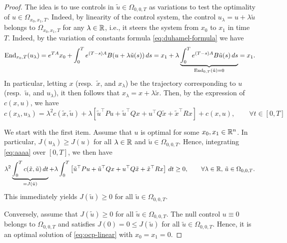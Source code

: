 \begin{proof}
    The idea is to use controls in $\tilde u \in \Omega_{0,0,T}$ as variations to test the optimality of $u\in \Omega_{x_0,x_1,T}$.
    Indeed, by linearity of the control system, the control $u_\lambda = u + \lambda \tilde u$ belongs to $\Omega_{x_0,x_1,T}$ for any $\lambda\in \mathbb{R}$, i.e., it steers the system from $x_0$ to $x_1$ in time $T$.
    Indeed, by the variation of constants formula \eqref{eq:duhamel-formula} we have
    \begin{equation}
        \operatorname{End}_{x_0,T}(u_\lambda) = e^{TA}x_0 + \int_0^T e^{(T-s)A}B(u + \lambda \tilde u(s))\, ds = x_1 + \lambda \underbrace{\int_0^T e^{(T-s)A}B\tilde u(s)\, ds}_{\operatorname{End}_{0,T}(\tilde u)=0} = x_1.
    \end{equation}
    In particular, letting $x$ (resp.~$\tilde x$, and $x_\lambda$) be the trajectory corresponding to $u$ (resp.~$\tilde u$, and $u_\lambda$), it then follows that $x_\lambda = x + \lambda \tilde x$.
    Then, by the expression of $c(x,u)$, we have
    \begin{equation}
        \label{eq:aaaa}
        c(x_\lambda,u_\lambda)
        = \lambda^2 c(\tilde x, \tilde u) + \lambda \left[\tilde u^\top P u + \tilde u^\top Q x + u^\top Q \tilde x + \tilde x^\top Rx \right] + c(x, u),
        \qquad \forall t\in [0,T]
    \end{equation}
    
    We start with the first item.
    Assume that $u$ is optimal for some $x_0,x_1\in\mathbb{R}^n$. In particular, $J(u_\lambda)\ge J(u)$ for all $\lambda\in \mathbb{R}$ and $\tilde u\in \Omega_{0,0,T}$. Hence, integrating \eqref{eq:aaaa} over $[0,T]$, we then have 
    \begin{equation}
       \lambda^2 \underbrace{\int_0^T c(\tilde x, \tilde u)\, dt}_{=J(\tilde u)} + \lambda \int_0^T \left[\tilde u^\top P u + \tilde u^\top Q x + u^\top Q \tilde x + \tilde x^\top Rx \right] \, dt \ge 0, 
       \qquad \forall \lambda\in \mathbb{R}, \, \tilde u\in \Omega_{0,0,T}.
    \end{equation}
    This immediately yields $J(\tilde u)\ge 0$ for all $\tilde u\in \Omega_{0,0,T}$.

    Conversely, assume that $J(\tilde u)\ge 0$ for all $\tilde u\in \Omega_{0,0,T}$.
    The null control $u\equiv0$ belongs to $\Omega_{0,0,T}$ and satisfies $J(0)=0\le J(\tilde u)$ for all $\tilde u\in\Omega_{0,0,T}$.
    Hence, it is an optimal solution of \eqref{eq:ocp-linear} with $x_0=x_1=0$.


\end{proof}
